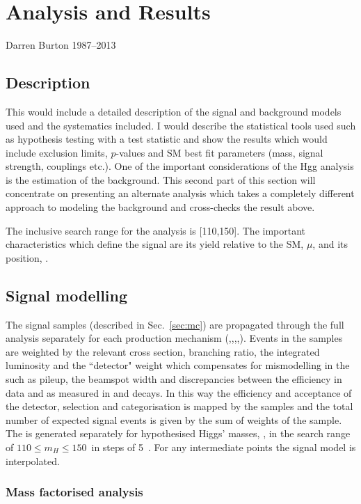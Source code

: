 \chapter{Analysis and Results}
\label{chap:results}
{Darren Burton 1987--2013}

\section{Description}

This would include a detailed description of the signal and background models used and the systematics included. I would describe the statistical tools used such as hypothesis testing with a test statistic and show the results which would include exclusion limits, $p$-values and SM best fit parameters (mass, signal strength, couplings etc.). One of the important considerations of the Hgg analysis is the estimation of the background. This second part of this section will concentrate on presenting an alternate analysis which takes a completely different approach to modeling the background and cross-checks the result above.

The inclusive search range for the analysis is [110,150]. The important characteristics which define the signal are its yield relative to the SM, $\mu$, and its position, \mH.
\section{Signal modelling}
\label{sec:signal_model}

  The signal \MC samples (described in Sec.~\ref{sec:mc}) are propagated through the full analysis separately for each production mechanism (\ggH,\VBF,\WH,\ZH,\ttH). Events in the samples are weighted by the relevant \SM cross section, branching ratio, the integrated luminosity and the ``detector" weight which compensates for mismodelling in the \MC such as pileup, the beamspot width and discrepancies between the efficiency in data and \MC as measured in \Zee and \Zmumugamma decays. In this way the efficiency and acceptance of the detector, selection and categorisation is mapped by the \MC samples and the total number of expected \SM signal events is given by the sum of weights of the sample. The \MC is generated separately for hypothesised Higgs' masses, \mH, in the search range of $110 \leq m_{H} \leq 150$~\GeV in steps of 5~\GeV. For any intermediate points the signal model is interpolated.

\subsection{Mass factorised analysis}
\label{sec:signal_mfm}


